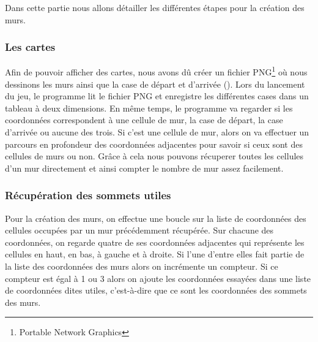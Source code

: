 \documentclass[11pt]{article}
\begin{document}
Dans cette partie nous allons détailler les différentes étapes pour la création des murs.

\subsubsection{Les cartes}
Afin de pouvoir afficher des cartes, nous avons dû créer un fichier PNG\footnote{Portable Network Graphics} où nous dessinons les murs ainsi que la case de départ et d'arrivée (). Lors du lancement du jeu, le programme lit le fichier PNG et enregistre les différentes cases dans un tableau à deux dimensions. En même temps, le programme va regarder si les coordonnées correspondent à une cellule de mur, la case de départ, la case d'arrivée ou aucune des trois. Si c'est une cellule de mur, alors on va effectuer un parcours en profondeur des coordonnées adjacentes pour savoir si ceux sont des cellules de murs ou non. Grâce à cela nous pouvons récuperer toutes les cellules d'un mur directement et ainsi compter le nombre de mur assez facilement.


\subsubsection{Récupération des sommets utiles}
Pour la création des murs, on effectue une boucle sur la liste de coordonnées des cellules occupées par un mur précédemment récupérée. Sur chacune des coordonnées, on regarde quatre de ses coordonnées adjacentes qui représente les cellules en haut, en bas, à gauche et à droite. Si l'une d'entre elles fait partie de la liste des coordonnées des murs alors on incrémente un compteur. Si ce compteur est égal à 1 ou 3 alors on ajoute les coordonnées essayées dans une liste de coordonnées dites utiles, c'est-à-dire que ce sont les coordonnées des sommets des murs.
\end{document}
